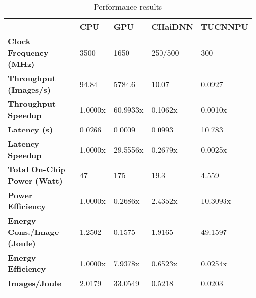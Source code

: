 \begin{table}[H]
	\caption{Performance results}
	\label{tab:Performance-results}
	\centering
	\begin{tabular}{lllll}
		\toprule
		& \textbf{CPU} & \textbf{GPU} & \textbf{CHaiDNN} & \textbf{TUCNNPU}\\
		\midrule
			\textbf{Clock Frequency (MHz)} & 3500 & 1650 & 250/500 & 300\\
			\textbf{Throughput (Images/s)} & 94.84 & 5784.6 & 10.07 & 0.0927\\
			\textbf{Throughput Speedup} & 1.0000x & 60.9933x & 0.1062x & 0.0010x\\
			\textbf{Latency (s)} & 0.0266 & 0.0009 & 0.0993 & 10.783\\
			\textbf{Latency Speedup} & 1.0000x & 29.5556x & 0.2679x & 0.0025x\\
			\textbf{Total On-Chip Power (Watt)} & 47 & 175 & 19.3 & 4.559\\
			\textbf{Power Efficiency} & 1.0000x & 0.2686x & 2.4352x & 10.3093x\\
			\textbf{Energy Cons./Image (Joule)} & 1.2502 & 0.1575 & 1.9165 & 49.1597\\
			\textbf{Energy Efficiency} & 1.0000x & 7.9378x & 0.6523x & 0.0254x\\
			\textbf{Images/Joule} & 2.0179 & 33.0549 & 0.5218 & 0.0203\\
		\bottomrule\\
	\end{tabular}
\end{table}
